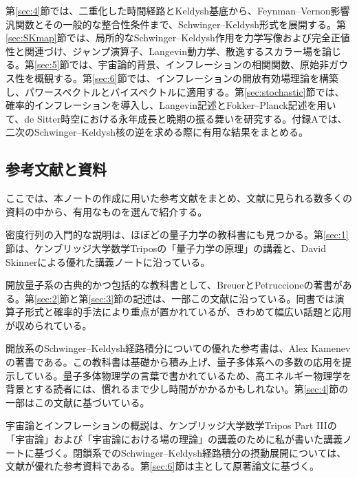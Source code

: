 \documentclass[a4paper,11pt,oneside]{article}
\theoremstyle{definition}
\numberwithin{equation}{section}
\begin{document}
第\ref{sec:4}節では、二重化した時間経路とKeldysh基底から、Feynman--Vernon影響汎関数とその一般的な整合性条件まで、Schwinger--Keldysh形式を展開する。第\ref{sec:SKmap}節では、局所的なSchwinger--Keldysh作用を力学写像および完全正値性と関連づけ、ジャンプ演算子、Langevin動力学、散逸するスカラー場を論じる。第\ref{sec:5}節では、宇宙論的背景、インフレーションの相関関数、原始非ガウス性を概観する。第\ref{sec:6}節では、インフレーションの開放有効場理論を構築し、パワースペクトルとバイスペクトルに適用する。第\ref{sec:stochastic}節では、確率的インフレーションを導入し、Langevin記述とFokker--Planck記述を用いて、de Sitter時空における永年成長と晩期の振る舞いを研究する。付録Aでは、二次のSchwinger--Keldysh核の逆を求める際に有用な結果をまとめる。





\subsection*{参考文献と資料}



ここでは、本ノートの作成に用いた参考文献をまとめ、文献に見られる数多くの資料の中から、有用なものを選んで紹介する。



密度行列の入門的な説明は、ほぼどの量子力学の教科書にも見つかる。第\ref{sec:1}節は、ケンブリッジ大学数学Triposの「量子力学の原理」の講義と、David Skinnerによる優れた講義ノート\cite{Skinner}に沿っている。



開放量子系の古典的かつ包括的な教科書として、BreuerとPetruccioneの著書\cite{breuerTheoryOpenQuantum2002}がある。第\ref{sec:2}節と第\ref{sec:3}節の記述は、一部この文献に沿っている。同書では演算子形式と確率的手法により重点が置かれているが、きわめて幅広い話題と応用が収められている。



開放系のSchwinger--Keldysh経路積分についての優れた参考書は、Alex Kamenevの著書\cite{kamenev_2011}である。この教科書は基礎から積み上げ、量子多体系への多数の応用を提示している。量子多体物理学の言葉で書かれているため、高エネルギー物理学を背景とする読者には、慣れるまで少し時間がかかるかもしれない。第\ref{sec:4}節の一部はこの文献に基づいている。



宇宙論とインフレーションの概説は、ケンブリッジ大学数学Tripos Part IIIの「宇宙論」\cite{PajerCosmologyNotes}および「宇宙論における場の理論」\cite{PajerFieldTheoryCosmologyNotes}の講義のために私が書いた講義ノートに基づく。閉鎖系でのSchwinger--Keldysh経路積分の摂動展開については、文献\cite{Chen:2017ryl}が優れた参考資料である。第\ref{sec:6}節は主として原著論文\cite{Creminelli:2006xe,Cheung:2007st,LopezNacir:2011kk,Salcedo:2024smn,Salcedo:2026sdn}に基づく。
\end{document}
